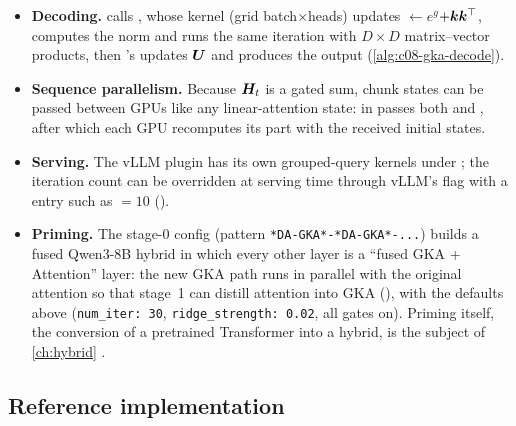 \begin{implnote}[title={In the code: decoding, sequence parallelism, serving, priming}]
\begin{itemize}
  \item \textbf{Decoding.}  calls
  , whose kernel (grid batch$\times$heads)
  updates  $\gets e^{g}$$+\bm{k}\bm{k}^{\top}$, computes the norm and runs the same
  iteration with $D\times D$ matrix--vector products, then \fla's 
  updates $\bm{U}$ and produces the output (\cref{alg:c08-gka-decode}).
  \item \textbf{Sequence parallelism.} Because $\bm{H}_t$ is a gated sum, chunk states can be passed
  between GPUs like any linear-attention state:  in
   passes both  and , after which
  each GPU recomputes its part with the received initial states.
  \item \textbf{Serving.} The vLLM plugin has its own grouped-query kernels under
  ; the iteration
  count can be overridden at serving time through vLLM's  flag with a
   entry such as  $=10$
  ().
  \item \textbf{Priming.} The stage-0 config
  (pattern \texttt{*DA-GKA*-*DA-GKA*-...}) builds a fused Qwen3-8B hybrid in which every other
  layer is a ``fused GKA + Attention'' layer: the new GKA path runs in parallel with the original
  attention so that stage~1 can distill attention into GKA (),
  with the defaults above (\texttt{num\_iter:~30}, \texttt{ridge\_strength:~0.02}, all gates on). Priming
  itself, the conversion of a pretrained Transformer into a hybrid, is the subject of \cref{ch:hybrid}
  \citep{chattopadhyay2026priming}.
\end{itemize}
\end{implnote}

\subsection{Reference implementation}

